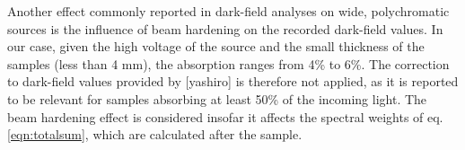 Another effect commonly reported in dark-field analyses on wide, polychromatic
sources is the influence of beam hardening on the recorded dark-field
values. In our case, given the high voltage of the source and the small
thickness of the samples (less than 4 mm), the absorption ranges from 4\% to
6\%. The correction to dark-field values provided by [yashiro] is therefore
not applied, as it is reported to be relevant for samples absorbing at least
50\% of the incoming light. The beam hardening effect is considered insofar
it affects the spectral weights of eq. \ref{eqn:totalsum}, which are calculated
after the sample.
